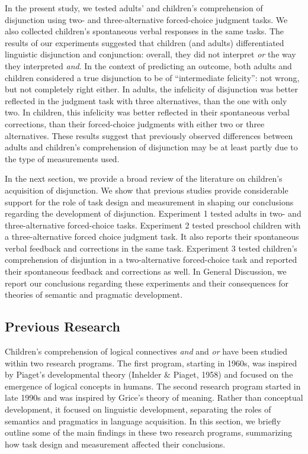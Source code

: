 \documentclass[,man,floatsintext]{apa6}
\begin{document}
In the present study, we tested adults' and children's comprehension of disjunction using two- and three-alternative forced-choice judgment tasks. We also collected children's spontaneous verbal responses in the same tasks. The results of our experiments suggested that children (and adults) differentiated linguistic disjunction and conjunction: overall, they did not interpret \emph{or} the way they interpreted \emph{and}. In the context of predicting an outcome, both adults and children considered a true disjunction to be of \enquote{intermediate felicity}: not wrong, but not completely right either. In adults, the infelicity of disjunction was better reflected in the judgment task with three alternatives, than the one with only two. In children, this infelicity was better reflected in their spontaneous verbal corrections, than their forced-choice judgments with either two or three alternatives. These results suggest that previously observed differences between adults and children's comprehension of disjunction may be at least partly due to the type of measurements used.

In the next section, we provide a broad review of the literature on children's acquisition of disjunction. We show that previous studies provide considerable support for the role of task design and measurement in shaping our conclusions regarding the development of disjunction. Experiment 1 tested adults in two- and three-alternative forced-choice tasks. Experiment 2 tested preschool children with a three-alternative forced choice judgment task. It also reports their spontaneous verbal feedback and corrections in the same task. Experiment 3 tested children's comprehension of disjuntion in a two-alternative forced-choice task and reported their spontaneous feedback and corrections as well. In General Discussion, we report our conclusions regarding these experiments and their consequences for theories of semantic and pragmatic development.

\hypertarget{litreview}{%
\subsection{Previous Research}\label{litreview}}

Children's comprehension of logical connectives \emph{and} and \emph{or} have been studied within two research programs. The first program, starting in 1960s, was inspired by Piaget's developmental theory (Inhelder \& Piaget, 1958) and focused on the emergence of logical concepts in humans. The second research program started in late 1990s and was inspired by Grice's theory of meaning. Rather than conceptual development, it focused on linguistic development, separating the roles of semantics and pragmatics in language acquisition. In this section, we briefly outline some of the main findings in these two research programs, summarizing how task design and measurement affected their conclusions.
\end{document}
